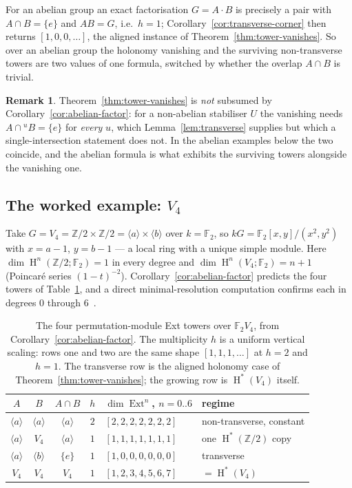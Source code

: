 \documentclass[11pt]{amsart}
\theoremstyle{plain}
\theoremstyle{definition}
\newtheorem{remark}[theorem]{Remark}
\DeclareMathOperator{\Ext}{Ext}
\DeclareMathOperator{\Hh}{H}
\newcommand{\conj}[2]{{}^{#1}\!#2}
\begin{document}
For an abelian group an exact factorisation $G=A\cdot B$ is precisely a pair with
$A\cap B=\{e\}$ and $AB=G$, i.e.\ $h=1$; Corollary~\ref{cor:transverse-corner} then returns
$[1,0,0,\dots]$, the aligned instance of Theorem~\ref{thm:tower-vanishes}. So over an
abelian group the holonomy vanishing and the surviving non-transverse towers are two values
of one formula, switched by whether the overlap $A\cap B$ is trivial.

\begin{remark}
Theorem~\ref{thm:tower-vanishes} is \emph{not} subsumed by
Corollary~\ref{cor:abelian-factor}: for a non-abelian stabiliser $U$ the vanishing needs
$A\cap\conj{u}{B}=\{e\}$ for \emph{every} $u$, which Lemma~\ref{lem:transverse} supplies but
which a single-intersection statement does not. In the abelian examples below the two
coincide, and the abelian formula is what exhibits the surviving towers alongside the
vanishing one.
\end{remark}

\subsection{The worked example: $V_4$}
Take $G=V_4=\mathbb{Z}/2\times\mathbb{Z}/2=\langle a\rangle\times\langle b\rangle$ over
$k=\mathbb{F}_2$, so $kG=\mathbb{F}_2[x,y]/(x^2,y^2)$ with $x=a-1$, $y=b-1$ --- a local ring
with a unique simple module. Here $\dim\Hh^n(\mathbb{Z}/2;\mathbb{F}_2)=1$ in every degree
and $\dim\Hh^n(V_4;\mathbb{F}_2)=n+1$ (Poincar\'e series $(1-t)^{-2}$).
Corollary~\ref{cor:abelian-factor} predicts the four towers of Table~\ref{tab:v4}, and a
direct minimal-resolution computation confirms each in degrees $0$ through
$6$~\cite{macbeth-rickv4}.

\begin{table}[t]
\renewcommand{\arraystretch}{1.25}
\begin{tabular}{ccccll}
\hline
$A$ & $B$ & $A\cap B$ & $h$ & $\dim\Ext^n$, $n=0..6$ & regime\\
\hline
$\langle a\rangle$ & $\langle a\rangle$ & $\langle a\rangle$ & $2$ & $[2,2,2,2,2,2,2]$ & non-transverse, constant\\
$\langle a\rangle$ & $V_4$ & $\langle a\rangle$ & $1$ & $[1,1,1,1,1,1,1]$ & one $\Hh^*(\mathbb{Z}/2)$ copy\\
$\langle a\rangle$ & $\langle b\rangle$ & $\{e\}$ & $1$ & $[1,0,0,0,0,0,0]$ & transverse\\
$V_4$ & $V_4$ & $V_4$ & $1$ & $[1,2,3,4,5,6,7]$ & $=\Hh^*(V_4)$\\
\hline
\end{tabular}
\medskip
\caption{The four permutation-module Ext towers over $\mathbb{F}_2 V_4$, from
Corollary~\ref{cor:abelian-factor}. The multiplicity $h$ is a uniform vertical scaling:
rows one and two are the same shape $[1,1,1,\dots]$ at $h=2$ and $h=1$. The transverse row
is the aligned holonomy case of Theorem~\ref{thm:tower-vanishes}; the growing row is
$\Hh^*(V_4)$ itself.}\label{tab:v4}
\end{table}
\end{document}
